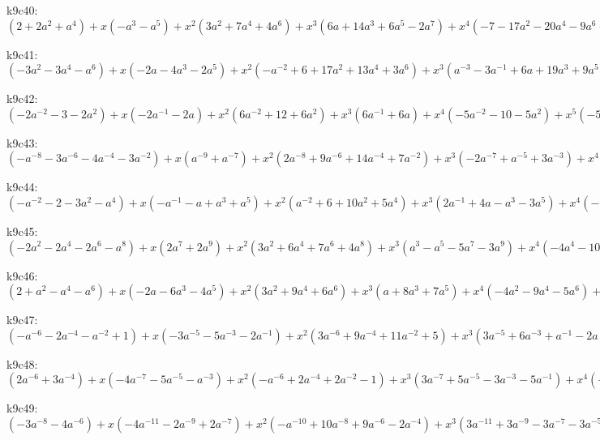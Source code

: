 k9c40: $ (2+2a^{2}+a^{4}) +x(-a^{3}-a^{5}) +x^{2}(3a^{2}+7a^{4}+4a^{6}) +x^{3}(6a+14a^{3}+6a^{5}-2a^{7}) +x^{4}(-7-17a^{2}-20a^{4}-9a^{6}+a^{8}) +x^{5}(a^{-1}-15a-32a^{3}-12a^{5}+4a^{7}) +x^{6}(5+4a^{2}+7a^{4}+8a^{6}) +x^{7}(8a+17a^{3}+9a^{5}) +x^{8}(4a^{2}+4a^{4}) $

k9c41: $ (-3a^{2}-3a^{4}-a^{6}) +x(-2a-4a^{3}-2a^{5}) +x^{2}(-a^{-2}+6+17a^{2}+13a^{4}+3a^{6}) +x^{3}(a^{-3}-3a^{-1}+6a+19a^{3}+9a^{5}) +x^{4}(3a^{-2}-11-23a^{2}-12a^{4}-3a^{6}) +x^{5}(5a^{-1}-11a-26a^{3}-10a^{5}) +x^{6}(7+5a^{2}-a^{4}+a^{6}) +x^{7}(6a+9a^{3}+3a^{5}) +x^{8}(2a^{2}+2a^{4}) $

k9c42: $ (-2a^{-2}-3-2a^{2}) +x(-2a^{-1}-2a) +x^{2}(6a^{-2}+12+6a^{2}) +x^{3}(6a^{-1}+6a) +x^{4}(-5a^{-2}-10-5a^{2}) +x^{5}(-5a^{-1}-5a) +x^{6}(a^{-2}+2+a^{2}) +x^{7}(a^{-1}+a) $

k9c43: $ (-a^{-8}-3a^{-6}-4a^{-4}-3a^{-2}) +x(a^{-9}+a^{-7}) +x^{2}(2a^{-8}+9a^{-6}+14a^{-4}+7a^{-2}) +x^{3}(-2a^{-7}+a^{-5}+3a^{-3}) +x^{4}(-8a^{-6}-13a^{-4}-5a^{-2}) +x^{5}(a^{-7}-3a^{-5}-4a^{-3}) +x^{6}(2a^{-6}+3a^{-4}+a^{-2}) +x^{7}(a^{-5}+a^{-3}) $

k9c44: $ (-a^{-2}-2-3a^{2}-a^{4}) +x(-a^{-1}-a+a^{3}+a^{5}) +x^{2}(a^{-2}+6+10a^{2}+5a^{4}) +x^{3}(2a^{-1}+4a-a^{3}-3a^{5}) +x^{4}(-3-10a^{2}-7a^{4}) +x^{5}(-3a-2a^{3}+a^{5}) +x^{6}(1+3a^{2}+2a^{4}) +x^{7}(a+a^{3}) $

k9c45: $ (-2a^{2}-2a^{4}-2a^{6}-a^{8}) +x(2a^{7}+2a^{9}) +x^{2}(3a^{2}+6a^{4}+7a^{6}+4a^{8}) +x^{3}(a^{3}-a^{5}-5a^{7}-3a^{9}) +x^{4}(-4a^{4}-10a^{6}-6a^{8}) +x^{5}(a^{3}+a^{9}) +x^{6}(2a^{4}+4a^{6}+2a^{8}) +x^{7}(a^{5}+a^{7}) $

k9c46: $ (2+a^{2}-a^{4}-a^{6}) +x(-2a-6a^{3}-4a^{5}) +x^{2}(3a^{2}+9a^{4}+6a^{6}) +x^{3}(a+8a^{3}+7a^{5}) +x^{4}(-4a^{2}-9a^{4}-5a^{6}) +x^{5}(-5a^{3}-5a^{5}) +x^{6}(a^{2}+2a^{4}+a^{6}) +x^{7}(a^{3}+a^{5}) $

k9c47: $ (-a^{-6}-2a^{-4}-a^{-2}+1) +x(-3a^{-5}-5a^{-3}-2a^{-1}) +x^{2}(3a^{-6}+9a^{-4}+11a^{-2}+5) +x^{3}(3a^{-5}+6a^{-3}+a^{-1}-2a) +x^{4}(-7a^{-4}-16a^{-2}-9) +x^{5}(a^{-5}-4a^{-3}-4a^{-1}+a) +x^{6}(3a^{-4}+6a^{-2}+3) +x^{7}(2a^{-3}+2a^{-1}) $

k9c48: $ (2a^{-6}+3a^{-4}) +x(-4a^{-7}-5a^{-5}-a^{-3}) +x^{2}(-a^{-6}+2a^{-4}+2a^{-2}-1) +x^{3}(3a^{-7}+5a^{-5}-3a^{-3}-5a^{-1}) +x^{4}(-6a^{-4}-5a^{-2}+1) +x^{5}(-a^{-5}+2a^{-3}+3a^{-1}) +x^{6}(a^{-6}+4a^{-4}+3a^{-2}) +x^{7}(a^{-5}+a^{-3}) $

k9c49: $ (-3a^{-8}-4a^{-6}) +x(-4a^{-11}-2a^{-9}+2a^{-7}) +x^{2}(-a^{-10}+10a^{-8}+9a^{-6}-2a^{-4}) +x^{3}(3a^{-11}+3a^{-9}-3a^{-7}-3a^{-5}) +x^{4}(-9a^{-8}-8a^{-6}+a^{-4}) +x^{5}(-a^{-9}+a^{-7}+2a^{-5}) +x^{6}(a^{-10}+4a^{-8}+3a^{-6}) +x^{7}(a^{-9}+a^{-7}) $

